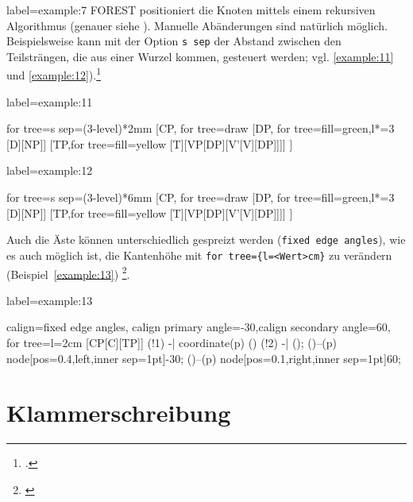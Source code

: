 \begin{lfgwcode}{label={example:7}}
FOREST positioniert die Knoten mittels einem rekursiven Algorithmus (genauer siehe 
\cite[Kap.\,2.4]{forest-doc}). Manuelle Abänderungen sind natürlich möglich. Beispielsweise
kann mit der Option 
\texttt{s sep} der Abstand zwischen den Teilsträngen, die aus einer Wurzel kommen, 
gesteuert werden; vgl. \ref{example:11} und \ref{example:12}).\footnote{\cite[Beispiel\,27]{forest-doc}.}


\begin{lfgwexample}{label={example:11}}
\begin{forest}
for tree={s sep=(3-level)*2mm}
[CP, for tree=draw
[DP, for tree={fill=green},l*=3
[D][NP]]
[TP,for tree={fill=yellow}
[T][VP[DP][V’[V][DP]]]]
]
\end{forest}
\end{lfgwexample}

\begin{lfgwexample}{label={example:12}}
\begin{forest}
for tree={s sep=(3-level)*6mm}
[CP, for tree=draw
[DP, for tree={fill=green},l*=3
[D][NP]]
[TP,for tree={fill=yellow}
[T][VP[DP][V’[V][DP]]]]
]
\end{forest}
\end{lfgwexample}

Auch die Äste können unterschiedlich gespreizt werden (\texttt{fixed edge angles}),
wie es auch möglich ist, die Kantenhöhe mit \verb|for tree={l=<Wert>cm}| zu verändern 
(Beispiel~\ref{example:13})
\footnote{\cite[Beispiel\,59]{forest-doc}}.

\begin{lfgwexample}{label={example:13}}
\begin{forest}
calign=fixed edge angles,
calign primary angle=-30,calign secondary angle=60,
for tree={l=2cm}
[CP[C][TP]]
\draw[dotted] (!1) -| coordinate(p) () (!2) -| ();
\path ()--(p) node[pos=0.4,left,inner sep=1pt]{-30};
\path ()--(p) node[pos=0.1,right,inner sep=1pt]{60};
\end{forest}
\end{lfgwexample}

\section{Klammerschreibung}


\end{lfgwcode}
